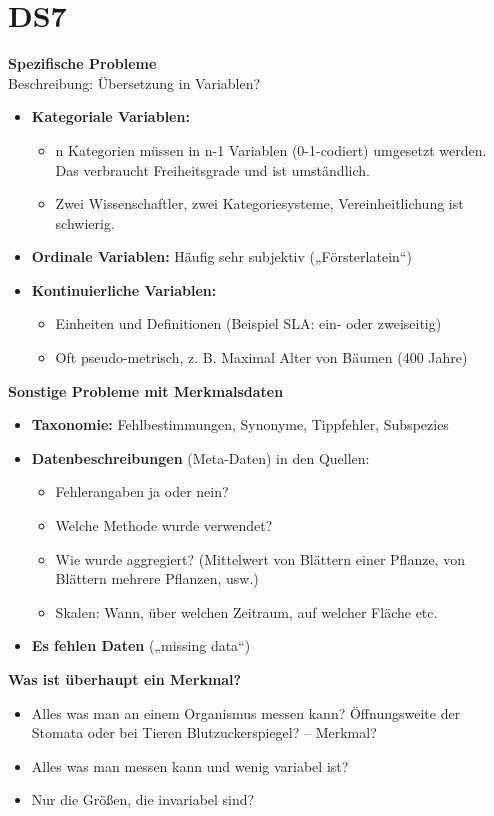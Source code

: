 \section{DS7}
\textbf{Spezifische Probleme}\\
Beschreibung: Übersetzung in Variablen?
\begin{itemize}
	\item \textbf{Kategoriale Variablen:}
	\begin{itemize}
		\item n Kategorien müssen in n-1 Variablen (0-1-codiert) umgesetzt werden. Das verbraucht Freiheitsgrade und ist umständlich.
		\item Zwei Wissenschaftler, zwei Kategoriesysteme, Vereinheitlichung ist schwierig.
	\end{itemize}
	\item \textbf{Ordinale Variablen:} Häufig sehr subjektiv („Försterlatein“)
	\item \textbf{Kontinuierliche Variablen:}
	\begin{itemize}
		\item Einheiten und Definitionen (Beispiel SLA: ein- oder zweiseitig)
		\item Oft pseudo-metrisch, z. B. Maximal Alter von Bäumen (400 Jahre)
	\end{itemize}
\end{itemize}

\textbf{Sonstige Probleme mit Merkmalsdaten}
\begin{itemize}
	\item \textbf{Taxonomie:} Fehlbestimmungen, Synonyme, Tippfehler, Subspezies
	\item \textbf{Datenbeschreibungen} (Meta-Daten) in den Quellen:
	\begin{itemize}
		\item Fehlerangaben ja oder nein?
		\item Welche Methode wurde verwendet?
		\item Wie wurde aggregiert? (Mittelwert von Blättern einer Pflanze, von Blättern mehrere Pflanzen, usw.)
		\item Skalen: Wann, über welchen Zeitraum, auf welcher Fläche etc.
	\end{itemize}
	\item \textbf{Es fehlen Daten} („missing data“)
\end{itemize}

\textbf{Was ist überhaupt ein Merkmal?}
\begin{itemize}
	\item Alles was man an einem Organismus messen kann? Öffnungsweite der Stomata oder bei Tieren Blutzuckerspiegel? – Merkmal?
	\item Alles was man messen kann und wenig variabel ist?
	\item Nur die Größen, die invariabel sind?
\end{itemize}

